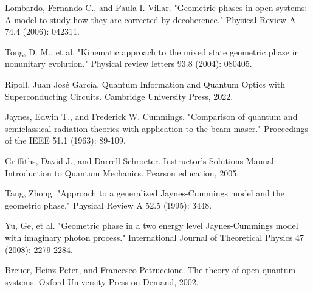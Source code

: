 \begin{thebibliography}{9}
 Lombardo, Fernando C., and Paula I. Villar. "Geometric phases in open systems: A model to study how they are corrected by decoherence." Physical Review A 74.4 (2006): 042311.

Tong, D. M., et al. "Kinematic approach to the mixed state geometric phase in nonunitary evolution." Physical review letters 93.8 (2004): 080405. 

Ripoll, Juan José García. Quantum Information and Quantum Optics with Superconducting Circuits. Cambridge University Press, 2022.

 Jaynes, Edwin T., and Frederick W. Cummings. "Comparison of quantum and semiclassical radiation theories with application to the beam maser." Proceedings of the IEEE 51.1 (1963): 89-109.

Griffiths, David J., and Darrell Schroeter. Instructor's Solutions Manual: Introduction to Quantum Mechanics. Pearson education, 2005.

 Tang, Zhong. "Approach to a generalized Jaynes-Cummings model and the geometric phase." Physical Review A 52.5 (1995): 3448.

 Yu, Ge, et al. "Geometric phase in a two energy level Jaynes-Cummings model with imaginary photon process." International Journal of Theoretical Physics 47 (2008): 2279-2284.

 Breuer, Heinz-Peter, and Francesco Petruccione. The theory of open quantum systems. Oxford University Press on Demand, 2002.


%

\end{thebibliography}
